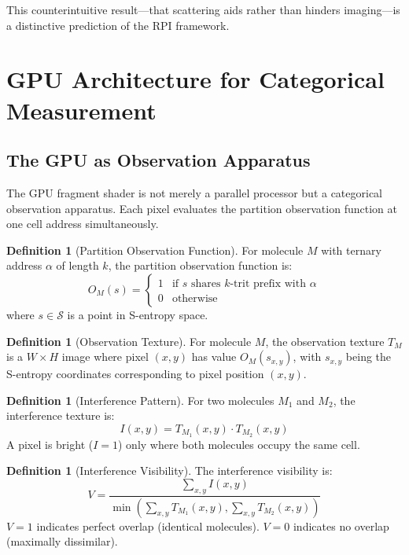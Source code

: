 \documentclass[11pt,a4paper]{article}
\theoremstyle{definition}
\newtheorem{definition}[theorem]{Definition}
\theoremstyle{remark}
\begin{document}
This counterintuitive result—that scattering aids rather than hinders imaging—is a distinctive prediction of the RPI framework.

\section{GPU Architecture for Categorical Measurement}
\label{sec:gpu_architecture}

\subsection{The GPU as Observation Apparatus}

The GPU fragment shader is not merely a parallel processor but a categorical observation apparatus. Each pixel evaluates the partition observation function at one cell address simultaneously.

\begin{definition}[Partition Observation Function]
\label{def:partition_observation}
For molecule $M$ with ternary address $\alpha$ of length $k$, the partition observation function is:
\begin{equation}
O_M(s) = \begin{cases}
1 & \text{if } s \text{ shares } k\text{-trit prefix with } \alpha \\
0 & \text{otherwise}
\end{cases}
\end{equation}
where $s \in \mathcal{S}$ is a point in S-entropy space.
\end{definition}

\begin{definition}[Observation Texture]
\label{def:observation_texture}
For molecule $M$, the observation texture $T_M$ is a $W \times H$ image where pixel $(x,y)$ has value $O_M(s_{x,y})$, with $s_{x,y}$ being the S-entropy coordinates corresponding to pixel position $(x,y)$.
\end{definition}

\begin{definition}[Interference Pattern]
\label{def:interference_pattern}
For two molecules $M_1$ and $M_2$, the interference texture is:
\begin{equation}
I(x,y) = T_{M_1}(x,y) \cdot T_{M_2}(x,y)
\end{equation}
A pixel is bright ($I=1$) only where both molecules occupy the same cell.
\end{definition}

\begin{definition}[Interference Visibility]
\label{def:interference_visibility}
The interference visibility is:
\begin{equation}
V = \frac{\sum_{x,y} I(x,y)}{\min\left(\sum_{x,y} T_{M_1}(x,y), \sum_{x,y} T_{M_2}(x,y)\right)}
\end{equation}
$V=1$ indicates perfect overlap (identical molecules). $V=0$ indicates no overlap (maximally dissimilar).
\end{definition}
\end{document}
